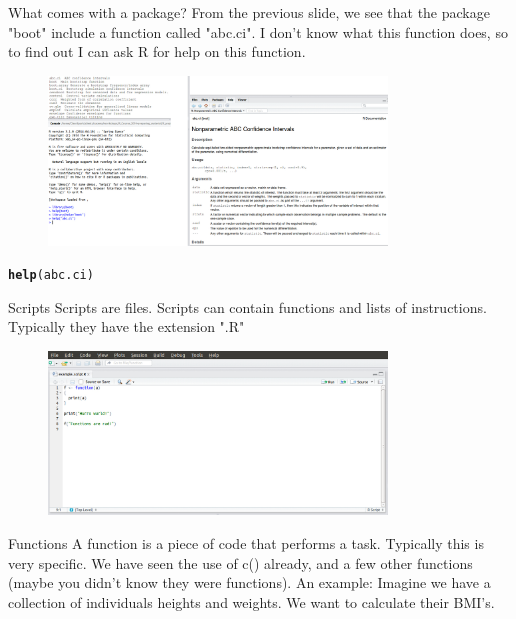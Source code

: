 \documentclass{beamer}\usepackage[]{graphicx}\usepackage[]{color}
\makeatletter
\newcommand{\hlstd}[1]{\textcolor[rgb]{0.345,0.345,0.345}{#1}}%
\newcommand{\hlkwd}[1]{\textcolor[rgb]{0.737,0.353,0.396}{\textbf{#1}}}%
\newenvironment{kframe}{%
 \def\at@end@of@kframe{}%
 \ifinner\ifhmode%
  \def\at@end@of@kframe{\end{minipage}}%
  \begin{minipage}{\columnwidth}%
 \fi\fi%
 \def\FrameCommand##1{\hskip\@totalleftmargin \hskip-\fboxsep
 \colorbox{shadecolor}{##1}\hskip-\fboxsep
     \hskip-\linewidth \hskip-\@totalleftmargin \hskip\columnwidth}%
 \MakeFramed {\advance\hsize-\width
   \@totalleftmargin\z@ \linewidth\hsize
   \@setminipage}}%
 {\par\unskip\endMakeFramed%
 \at@end@of@kframe}
\newenvironment{knitrout}{}{} %
\makeatother
\begin{document}
\begin{frame}[fragile]{What comes with a package?}
From the previous slide, we see that the package "boot" include a function called "abc.ci". I don't know what this function does, so to find out I can ask R for help on this function.
\begin{figure}[ht!]
\centering
\includegraphics[width=90mm]{pictures/help_abc_ci.png}
\label{overflow}
\end{figure}
\begin{knitrout}
\color{fgcolor}\begin{kframe}
\begin{alltt}
\hlkwd{help}\hlstd{(abc.ci)}
\end{alltt}
\end{kframe}
\end{knitrout}

\end{frame}



\begin{frame}[fragile]{Scripts}
Scripts are files.
\linebreak
Scripts can contain functions and lists of instructions. Typically they have the extension ".R"
\begin{figure}[ht!]
\centering
\includegraphics[width=90mm]{pictures/example_script.png}
\label{overflow}
\end{figure}
\end{frame}


\begin{frame}[fragile]{Functions}
A function is a piece of code that performs a task. Typically this is very specific.
\linebreak
\linebreak
We have seen the use of c() already, and a few other functions (maybe you didn’t know they were functions).
\linebreak
\linebreak
An example:
\linebreak
Imagine we have a collection of individuals heights and weights. We want to calculate their BMI's.
\end{frame}
\end{document}
